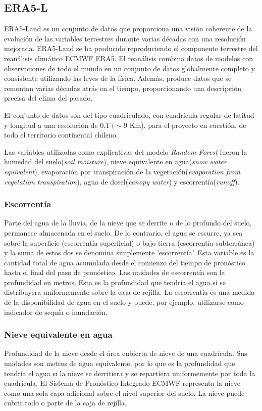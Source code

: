     \subsection{ERA5-L}
    ERA5-Land es un conjunto de datos que proporciona una visión coherente de la evolución de las variables terrestres durante varias décadas 
    con una resolución mejorada. ERA5-Land se ha producido reproduciendo el componente terrestre del reanálisis climático ECMWF ERA5. El reanálisis combina 
    datos de modelos con observaciones de todo el mundo en un conjunto de datos globalmente completo y consistente utilizando las leyes de la física. 
    Además, produce datos que se remontan varias décadas atrás en el tiempo, proporcionando una descripción precisa del clima del pasado\cite{ERA5-L}.

    El conjunto de datos son del tipo cuadriculado, con cuadrícula regular de latitud y longitud a una resolución de 0.1$^{\circ}(\sim 9$ Km), 
    para el proyecto en cuestión, de todo el territorio continental chileno.

    Las variables utilizadas como explicativas del modelo \textit{Random Forest} fueron la humedad del suelo(\textit{soil moisture}), nieve equivalente en agua(\textit{snow water equivalent}),
    evaporación por transpiración de la vegetación(\textit{evaporation from vegetation transpiration}), agua de dosel(\textit{canopy water}) y escorrentía(\textit{runoff}).
    
    \subsubsection{Escorrentía}
    Parte del agua de la lluvia, de la nieve que se derrite o de lo profundo del suelo, permanece almacenada en el suelo. De lo contrario, el agua se escurre, ya sea sobre la superficie (escorrentía superficial)
    o bajo tierra (escorrentía subterránea) y la suma de estos dos se denomina simplemente 'escorrentía'. Esta variable es la cantidad total de agua acumulada desde el comienzo del tiempo de pronóstico hasta el 
    final del paso de pronóstico. Las unidades de escorrentía son la profundidad en metros. Esta es la profundidad que tendría el agua si se distribuyera uniformemente sobre la caja de rejilla.
    La escorrentía es una medida de la disponibilidad de agua en el suelo y puede, por ejemplo, utilizarse como indicador de sequía o inundación.

    \subsubsection{Nieve equivalente en agua}
    Profundidad de la nieve desde el área cubierta de nieve de una cuadrícula. Sus unidades son metros de agua equivalente, por lo que es la profundidad que tendría el agua si la nieve se derritiera y se 
    repartiera uniformemente por toda la cuadrícula. El Sistema de Pronóstico Integrado ECMWF representa la nieve como una sola capa adicional sobre el nivel superior del suelo. La nieve puede cubrir todo o parte de la caja de rejilla.

